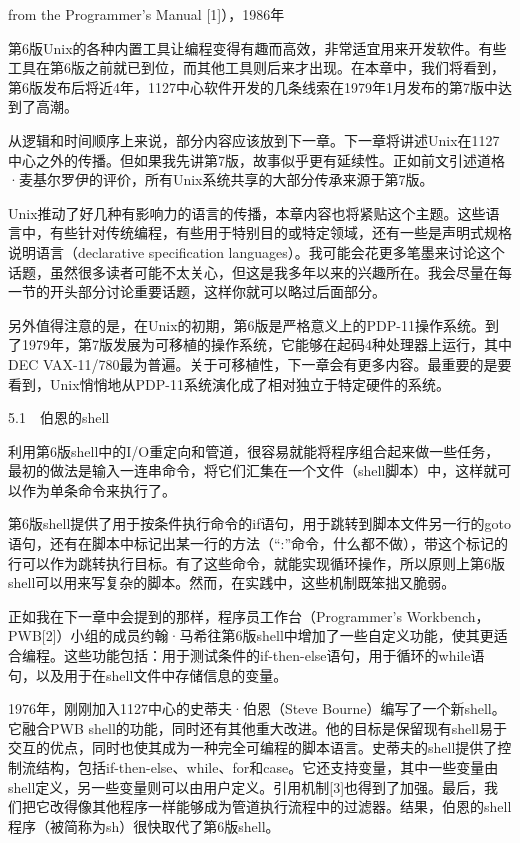 \documentclass[a4paper,12pt,UTF8,twoside]{ctexbook}
\begin{document}
{from the Programmer’s Manual [1]），1986年

第6版Unix的各种内置工具让编程变得有趣而高效，非常适宜用来开发软件。有些工具在第6版之前就已到位，而其他工具则后来才出现。在本章中，我们将看到，第6版发布后将近4年，1127中心软件开发的几条线索在1979年1月发布的第7版中达到了高潮。

从逻辑和时间顺序上来说，部分内容应该放到下一章。下一章将讲述Unix在1127中心之外的传播。但如果我先讲第7版，故事似乎更有延续性。正如前文引述道格·麦基尔罗伊的评价，所有Unix系统共享的大部分传承来源于第7版。

Unix推动了好几种有影响力的语言的传播，本章内容也将紧贴这个主题。这些语言中，有些针对传统编程，有些用于特别目的或特定领域，还有一些是声明式规格说明语言（declarative specification languages）。我可能会花更多笔墨来讨论这个话题，虽然很多读者可能不太关心，但这是我多年以来的兴趣所在。我会尽量在每一节的开头部分讨论重要话题，这样你就可以略过后面部分。

另外值得注意的是，在Unix的初期，第6版是严格意义上的PDP-11操作系统。到了1979年，第7版发展为可移植的操作系统，它能够在起码4种处理器上运行，其中DEC VAX-11/780最为普遍。关于可移植性，下一章会有更多内容。最重要的是要看到，Unix悄悄地从PDP-11系统演化成了相对独立于特定硬件的系统。





5.1　伯恩的shell


利用第6版shell中的I/O重定向和管道，很容易就能将程序组合起来做一些任务，最初的做法是输入一连串命令，将它们汇集在一个文件（shell脚本）中，这样就可以作为单条命令来执行了。

第6版shell提供了用于按条件执行命令的if语句，用于跳转到脚本文件另一行的goto语句，还有在脚本中标记出某一行的方法（“:”命令，什么都不做），带这个标记的行可以作为跳转执行目标。有了这些命令，就能实现循环操作，所以原则上第6版shell可以用来写复杂的脚本。然而，在实践中，这些机制既笨拙又脆弱。

正如我在下一章中会提到的那样，程序员工作台（Programmer’s Workbench，PWB[2]）小组的成员约翰·马希往第6版shell中增加了一些自定义功能，使其更适合编程。这些功能包括：用于测试条件的if-then-else语句，用于循环的while语句，以及用于在shell文件中存储信息的变量。

1976年，刚刚加入1127中心的史蒂夫·伯恩（Steve Bourne）编写了一个新shell。它融合PWB shell的功能，同时还有其他重大改进。他的目标是保留现有shell易于交互的优点，同时也使其成为一种完全可编程的脚本语言。史蒂夫的shell提供了控制流结构，包括if-then-else、while、for和case。它还支持变量，其中一些变量由shell定义，另一些变量则可以由用户定义。引用机制[3]也得到了加强。最后，我们把它改得像其他程序一样能够成为管道执行流程中的过滤器。结果，伯恩的shell程序（被简称为sh）很快取代了第6版shell。

}
\end{document}

